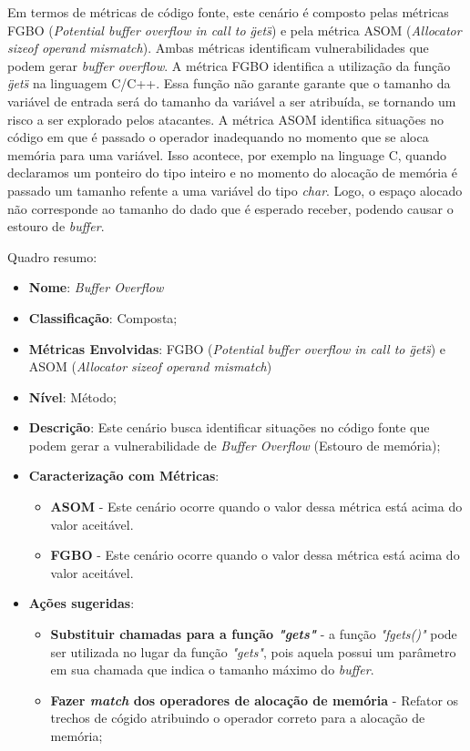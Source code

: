 Em termos de métricas de código fonte, este cenário é composto pelas métricas FGBO (\emph{Potential buffer overflow in call to \"gets\"}) e pela métrica ASOM (\emph{Allocator sizeof operand mismatch}). Ambas métricas identificam vulnerabilidades que podem gerar \emph{buffer overflow}. A métrica FGBO identifica a utilização da função \emph{\"gets\"} na linguagem C/C++. Essa função não garante garante que o tamanho da variável de entrada será do tamanho da variável a ser atribuída, se tornando um risco a ser explorado pelos atacantes. A métrica ASOM identifica situações no código em que é passado o operador inadequando no momento que se aloca memória para uma variável. Isso acontece, por exemplo na linguage C, quando declaramos um ponteiro do tipo inteiro e no momento do alocação de memória é passado um tamanho refente a uma variável do tipo \emph{char}. Logo, o espaço alocado não corresponde ao tamanho do dado que é esperado receber, podendo causar o estouro de \emph{buffer}.

Quadro resumo:

\begin{itemize}
\item \textbf{Nome}: \emph{Buffer Overflow}
\item \textbf{Classificação}: Composta;
\item \textbf{Métricas Envolvidas}: FGBO (\emph{Potential buffer overflow in call to \"gets\"}) e ASOM (\emph{Allocator sizeof operand mismatch})
\item \textbf{Nível}: Método;
\item \textbf{Descrição}: Este cenário busca identificar situações no código fonte que podem gerar a vulnerabilidade de \emph{Buffer Overflow} (Estouro de memória);
\item \textbf{Caracterização com Métricas}: 
	\begin{itemize}
	\item \textbf{ASOM} - Este cenário ocorre quando o valor dessa métrica está acima do valor aceitável.
	\item \textbf{FGBO} - Este cenário ocorre quando o valor dessa métrica está acima do valor aceitável.
	\end{itemize}
\item \textbf{Ações sugeridas}: 
	\begin{itemize}
	\item \textbf{Substituir chamadas para a função \emph{"gets"}} - a função \emph{"fgets()"} pode ser utilizada no lugar da função  \emph{"gets"}, pois aquela possui um parâmetro em sua chamada que indica o tamanho máximo do \emph{buffer}.  
	\item \textbf{Fazer \emph{match} dos operadores de alocação de memória} - Refator os trechos de cógido atribuindo o operador correto para a alocação de memória; 
	\end{itemize}
\end{itemize}

